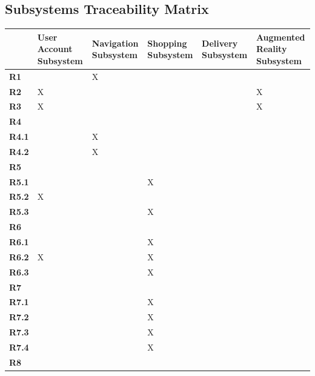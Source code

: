 \documentclass{article}
\begin{document}
    
\subsection{Subsystems Traceability Matrix}
    \begin{center}
        \begin{tabular}{ |p{1cm}|>{\centering}p{2.5cm}|>{\centering}p{2cm}|>{\centering}p{2.6cm}|>{\centering}p{2cm}|>{\centering}p{3.3cm}| }
             \hline
              & \textbf{User Account Subsystem} & \textbf{Navigation Subsystem} & \textbf{Shopping Subsystem} & \textbf{Delivery Subsystem} & \textbf{Augmented Reality Subsystem} \tabularnewline
             \hline
             \textbf{R1} & & X & & & \\
             \hline
             \textbf{R2} &X & & & & X\tabularnewline
             \hline
             \textbf{R3} &X & & & & X\tabularnewline
             \hline
             \textbf{R4} & & & & & \\
             \hline
             \textbf{R4.1} & &X & & & \\
             \hline
             \textbf{R4.2} & &X & & & \\
             \hline
             \textbf{R5} & & & & & \\
             \hline
             \textbf{R5.1} & & &X & & \\
             \hline
             \textbf{R5.2} &X & & & & \\
             \hline
             \textbf{R5.3} & & &X & & \\
             \hline
             \textbf{R6} & & & & & \\
             \hline
             \textbf{R6.1} & & &X & & \\
             \hline
             \textbf{R6.2} &X & &X & & \\
             \hline
             \textbf{R6.3} & & &X & & \\
             \hline
             \textbf{R7} & & & & & \\
             \hline
             \textbf{R7.1} & & &X & & \\
             \hline
             \textbf{R7.2} & & &X & & \\
             \hline
             \textbf{R7.3} & & &X & & \\
             \hline
             \textbf{R7.4} & & & X& & \\
             \hline
             \textbf{R8} & & & & & \\

\end{tabular}
\end{center}
\end{document}
